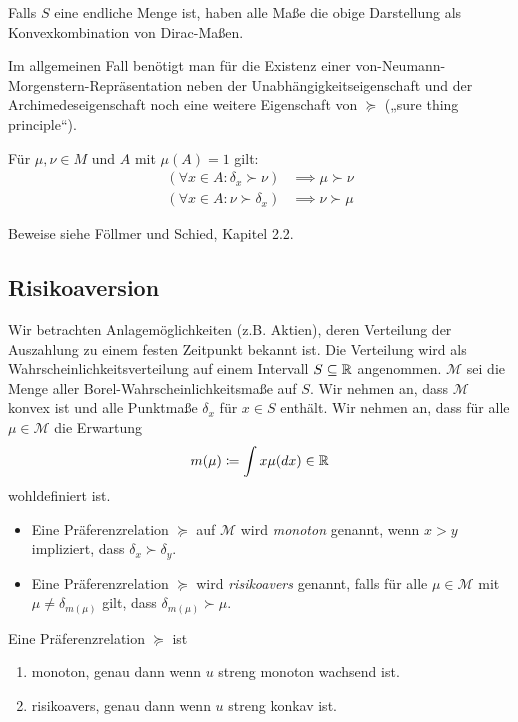 \documentclass[a4paper,twoside,DIV15,BCOR12mm]{scrbook}
\newcommand{\cM}{\mathcal M}
\begin{document}
Falls $S$ eine endliche Menge ist, haben alle Maße die obige Darstellung als Konvexkombination von Dirac-Maßen.

Im allgemeinen Fall benötigt man für die Existenz einer von-Neumann-Morgenstern-Repräsentation neben der Unabhängigkeitseigenschaft und der Archimedeseigenschaft noch eine weitere Eigenschaft von $\succeq$ („sure thing principle“).

Für $\mu,\nu \in M$ und $A$ mit $\mu(A)=1$ gilt:
\begin{align*}
(\forall x\in A:\delta_x\succ \nu) &\implies \mu \succ \nu \\
(\forall x\in A:\nu \succ \delta_x) &\implies \nu \succ \mu
\end{align*}

Beweise siehe Föllmer und Schied, Kapitel 2.2.

\subsection{Risikoaversion}

Wir betrachten Anlagemöglichkeiten (z.B. Aktien), deren Verteilung der Auszahlung zu einem festen Zeitpunkt bekannt ist. Die Verteilung wird als Wahrscheinlichkeitsverteilung auf einem Intervall $S\subseteq \mathbb{R}$ angenommen. $\cM$ sei die Menge aller Borel-Wahrscheinlichkeitsmaße auf $S$. Wir nehmen an, dass $\cM$ konvex ist und alle Punktmaße $\delta_x$ für $x\in S$ enthält. Wir nehmen an, dass für alle $\mu\in\cM$ die Erwartung 
\[
m(\mu) \da \int x \mu (dx) \in \MdR
\]
wohldefiniert ist.

\begin{definition}
\begin{itemize}
\item Eine Präferenzrelation $\succeq$ auf $\cM$ wird \emph{monoton} genannt, wenn $x>y$ impliziert, dass $\delta_x \succ \delta_y$.
\item Eine Präferenzrelation $\succeq$ wird \emph{risikoavers} genannt, falls für alle $\mu\in\cM$ mit $\mu \ne \delta_{m(\mu)}$ gilt, dass $\delta_{m(\mu)} \succ \mu$.
\end{itemize}
\end{definition}

\begin{satz}
Eine Präferenzrelation $\succeq$ ist 
\begin{enumerate}
\item monoton, genau dann wenn $u$ streng monoton wachsend ist.
\item risikoavers, genau dann wenn $u$ streng konkav ist.
\end{enumerate}
\end{satz}
\end{document}
